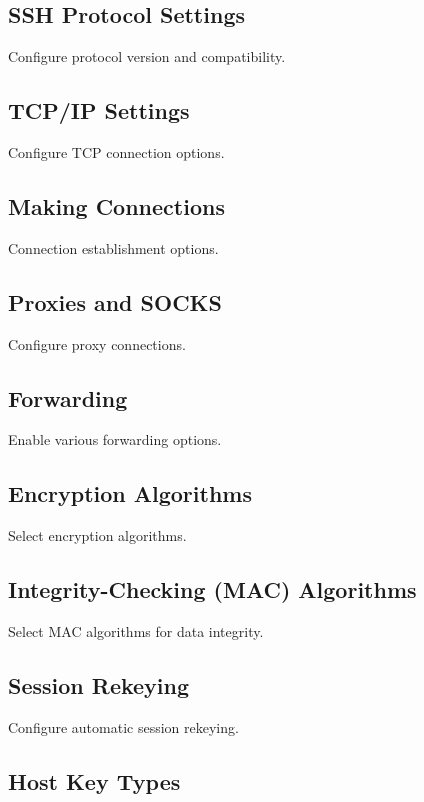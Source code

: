 \documentclass[12pt]{book}
\begin{document}
\subsection{SSH Protocol Settings}

Configure protocol version and compatibility.

\subsection{TCP/IP Settings}

Configure TCP connection options.

\subsection{Making Connections}

Connection establishment options.

\subsection{Proxies and SOCKS}

Configure proxy connections.

\subsection{Forwarding}

Enable various forwarding options.

\subsection{Encryption Algorithms}

Select encryption algorithms.

\subsection{Integrity-Checking (MAC) Algorithms}

Select MAC algorithms for data integrity.

\subsection{Session Rekeying}

Configure automatic session rekeying.

\subsection{Host Key Types}
\end{document}
